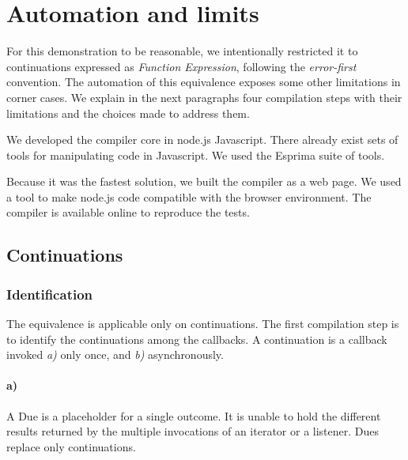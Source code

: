 \section{Automation and limits} \label{section:limits}


For this demonstration to be reasonable, we intentionally restricted it to continuations expressed as \textit{Function Expression}, following the \textit{error-first} convention.
The automation of this equivalence exposes some other limitations in corner cases.
We explain in the next paragraphs four compilation steps with their limitations and the choices made to address them.



We developed the compiler core in node.js Javascript.
There already exist sets of tools for manipulating code in Javascript.
We used the Esprima suite of tools.

Because it was the fastest solution, we built the compiler as a web page.
We used a tool to make node.js code compatible with the browser environment.
The compiler is available online to reproduce the tests.



\subsection{Continuations}

\subsubsection{Identification}

The equivalence is applicable only on continuations.
The first compilation step is to identify the continuations among the callbacks.
A continuation is a callback invoked \textit{a)} only once, and \textit{b)} asynchronously.

\paragraph{a)}
A Due is a placeholder for a single outcome.
It is unable to hold the different results returned by the multiple invocations of an iterator or a listener.
Dues replace only continuations.

